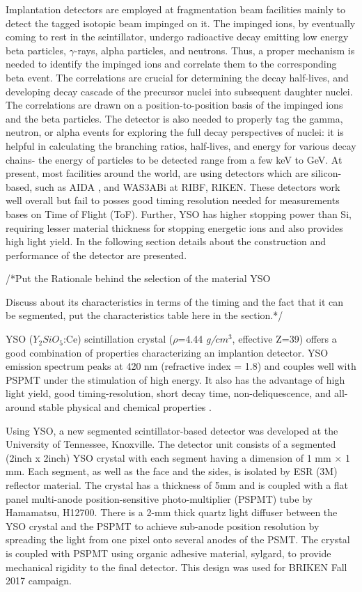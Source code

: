 Implantation detectors are employed at fragmentation beam facilities mainly to detect the tagged isotopic beam impinged on it. The impinged ions, by eventually coming to rest in the scintillator, undergo radioactive decay emitting low energy beta particles, $\gamma$-rays, alpha particles, and neutrons. Thus, a proper mechanism is needed to identify the impinged ions and correlate them to the corresponding beta event. The correlations are crucial for determining the decay half-lives, and developing decay cascade of the precursor nuclei into subsequent daughter nuclei. The correlations are drawn on a position-to-position basis of the impinged ions and the beta particles. The detector is also needed to properly tag the gamma, neutron, or alpha events for exploring the full decay perspectives of nuclei: it is helpful in calculating the branching ratios, half-lives, and energy for various decay chains- the energy of particles to be detected range from a few keV to GeV. At present, most facilities around the world, are using detectors which are silicon-based, such as AIDA \citep{AIDA}, and WAS3ABi \citep{wasabi} at RIBF, RIKEN. These detectors work well overall but fail to posses good timing resolution needed for measurements bases on Time of Flight (ToF). Further, YSO has higher stopping power than Si, requiring lesser material thickness for stopping energetic ions and also provides high light yield.
In the following section details about the construction and performance of the detector are presented.




/*Put the Rationale behind the selection of the material YSO

Discuss about its characteristics in terms of the timing and the fact that it can be segmented,
put the characteristics table here in the section.*/


YSO ($Y_{2}SiO_{5}$:Ce) scintillation crystal ($\rho$=4.44 \textit{g/$cm^{3}$}, effective Z=39) offers a good combination of properties characterizing an implantion detector. YSO emission spectrum peaks at 420 nm (refractive index = 1.8) and couples well with PSPMT under the stimulation of high energy. It also has the advantage of high light yield, good timing-resolution, short decay time, non-deliquescence, and all-around stable physical and chemical properties \citep{ysospecs}.

Using YSO, a new segmented scintillator-based detector was developed at the University of Tennessee, Knoxville. The detector unit consists of a segmented (2inch x 2inch) YSO crystal with each segment having a dimension of 1 mm $\times$ 1 mm. Each segment, as well as the face and the sides, is isolated by ESR (3M) reflector material. The crystal has a thickness of 5mm and is coupled with a flat panel multi-anode position-sensitive photo-multiplier (PSPMT) tube by Hamamatsu, H12700. There is a 2-mm thick quartz light diffuser between the YSO crystal and the PSPMT to achieve sub-anode position resolution by spreading the light from one pixel onto several anodes of the PSMT. The crystal is coupled with PSPMT using organic adhesive material, sylgard, to provide mechanical rigidity to the final detector. This design was used for BRIKEN Fall 2017 campaign.

